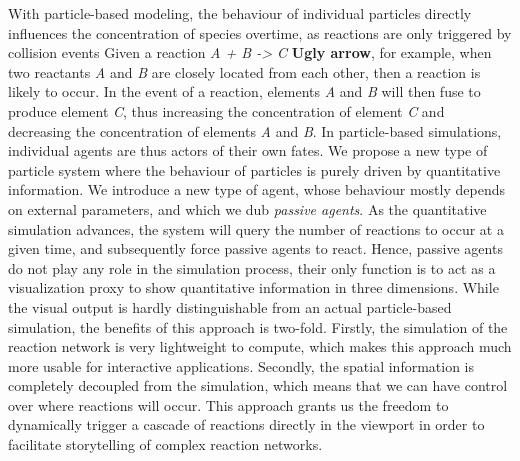 With particle-based modeling, the behaviour of individual particles directly influences the concentration of species overtime, as reactions are only triggered by collision events
Given a reaction \textit{A + B -> C} \textbf{Ugly arrow}, for example, when two reactants \textit{A} and \textit{B} are closely located from each other, then a reaction is likely to occur.
In the event of a reaction, elements \textit{A} and \textit{B} will then fuse to produce element \textit{C}, thus increasing the concentration of element \textit{C} and decreasing the concentration of elements \textit{A} and \textit{B}.
In particle-based simulations, individual agents are thus actors of their own fates.
We propose a new type of particle system where the behaviour of particles is purely driven by quantitative information.
We introduce a new type of agent, whose behaviour mostly depends on external parameters, and which we dub \emph{passive agents}.
As the quantitative simulation advances, the system will query the number of reactions to occur at a given time, and subsequently force passive agents to react.
Hence, passive agents do not play any role in the simulation process, their only function is to act as a visualization proxy to show quantitative information in three dimensions.
While the visual output is hardly distinguishable from an actual particle-based simulation, the benefits of this approach is two-fold.
Firstly, the simulation of the reaction network is very lightweight to compute, which makes this approach much more usable for interactive applications.
Secondly, the spatial information is completely decoupled from the simulation, which means that we can have control over where reactions will occur.
This approach grants us the freedom to dynamically trigger a cascade of reactions directly in the viewport in order to facilitate storytelling of complex reaction networks.

